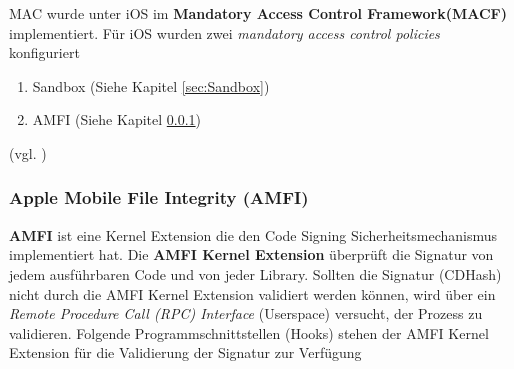 MAC wurde unter iOS im \textbf{Mandatory Access Control Framework(MACF)} implementiert. Für iOS wurden zwei \textit{\glqq mandatory access control policies\grqq{}} konfiguriert
\begin{enumerate}
   \item Sandbox (Siehe Kapitel \ref{sec:Sandbox})
   \item AMFI (Siehe Kapitel \ref{sec:AMFI})
\end{enumerate}
(vgl. \cite{iOSSec[5], Hacking[1]})

\subsubsection{Apple Mobile File Integrity (AMFI)}
\label{sec:AMFI}
\textbf{AMFI } ist eine Kernel Extension die den Code Signing Sicherheitsmechanismus implementiert hat. Die \textbf{AMFI Kernel Extension} überprüft die Signatur von jedem ausführbaren Code und von jeder Library. Sollten die Signatur (CDHash) nicht durch die AMFI Kernel Extension validiert werden können, wird über ein \textit{\glqq Remote Procedure Call (RPC) Interface\grqq{}} (Userspace) versucht, der Prozess zu validieren. Folgende Programmschnittstellen (Hooks) stehen der AMFI Kernel Extension für die Validierung der Signatur zur Verfügung

